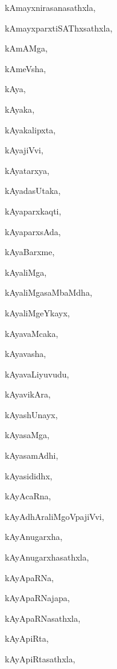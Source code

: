 \begin{multicols}{2}
{kAmayxnirasanasathxla}, \pageref{kAmayxnirasanasathxla}

{kAmayxparxtiSAThxsathxla}, \pageref{kAmayxparxtiSAThxsathxla}

{kAmAMga}, \pageref{kAmAMga}

{kAmeVsha}, \pageref{kAmeVsha}

{kAya}, \pageref{kAya}

{kAyaka}, \pageref{kAyaka}

{kAyakalipxta}, \pageref{kAyakalipxta}

{kAyajiVvi}, \pageref{kAyajiVvi}

{kAyatarxya}, \pageref{kAyatarxya}

{kAyadasUtaka}, \pageref{kAyadasUtaka}

{kAyaparxkaqti}, \pageref{kAyaparxkaqti}

{kAyaparxsAda}, \pageref{kAyaparxsAda}

{kAyaBarxme}, \pageref{kAyaBarxme}

{kAyaliMga}, \pageref{kAyaliMga}

{kAyaliMgasaMbaMdha}, \pageref{kAyaliMgasaMbaMdha}

{kAyaliMgeYkayx}, \pageref{kAyaliMgeYkayx}

{kAyavaMcaka}, \pageref{kAyavaMcaka}

{kAyavasha}, \pageref{kAyavasha}

{kAyavaLiyuvudu}, \pageref{kAyavaLiyuvudu}

{kAyavikAra}, \pageref{kAyavikAra}

{kAyashUnayx}, \pageref{kAyashUnayx}

{kAyasaMga}, \pageref{kAyasaMga}

{kAyasamAdhi}, \pageref{kAyasamAdhi}

{kAyasididhx}, \pageref{kAyasididhx}

{kAyAcaRna}, \pageref{kAyAcaRna}

{kAyAdhAraliMgoVpajiVvi}, \pageref{kAyAdhAraliMgoVpajiVvi}

{kAyAnugarxha}, \pageref{kAyAnugarxha}

{kAyAnugarxhasathxla}, \pageref{kAyAnugarxhasathxla}

{kAyApaRNa}, \pageref{kAyApaRNa}

{kAyApaRNajapa}, \pageref{kAyApaRNajapa}

{kAyApaRNasathxla}, \pageref{kAyApaRNasathxla}

{kAyApiRta}, \pageref{kAyApiRta}

{kAyApiRtasathxla}, \pageref{kAyApiRtasathxla}


\end{multicols}
